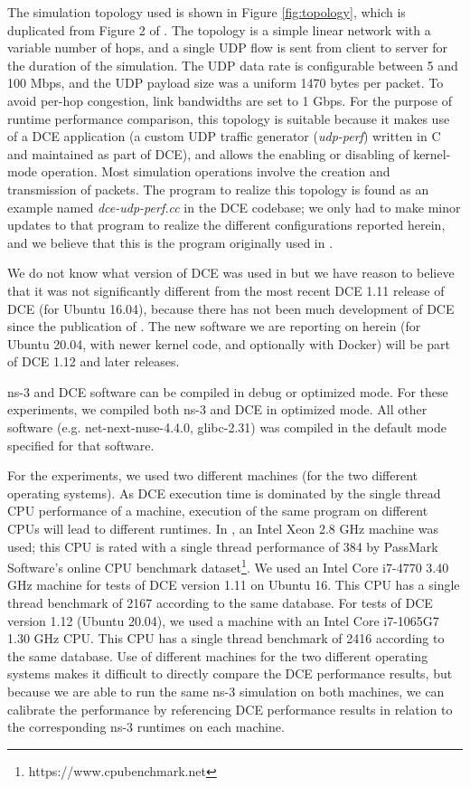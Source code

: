 \documentclass{sig-alternate}
\begin{document}
The simulation topology used is shown in Figure \ref{fig:topology}, which
is duplicated from Figure 2 of \cite{Tazaki13}.  The topology is a simple
linear network with a variable number of hops, and a single UDP flow
is sent from client to server for the duration of the simulation.
The UDP data rate is configurable between 5 and 100 Mbps, and the UDP
payload size was a uniform 1470 bytes per packet.
To avoid per-hop congestion, link bandwidths are set to 1 Gbps.
For the purpose of runtime performance comparison, this topology is
suitable because it makes use of a DCE application (a custom UDP traffic
generator (\emph{udp-perf}) written in C and maintained as part of DCE),
and allows the enabling or disabling of kernel-mode operation.  Most
simulation operations involve the creation and transmission of packets.
The program to realize this topology is found as an example named
\emph{dce-udp-perf.cc} in the DCE codebase; we only had to make minor
updates to that program to realize the different configurations reported
herein, and we believe that this is the program originally used
in \cite{Tazaki13}.

We do not know what version of DCE was used in \cite{Tazaki13} but we
have reason to believe that it was not significantly different from the
most recent DCE 1.11 release of DCE (for Ubuntu 16.04), because there
has not been much development of DCE since the publication of \cite{Tazaki13}.
The new software we are reporting on herein (for Ubuntu 20.04, with newer
kernel code, and optionally with Docker) will be part of DCE 1.12 and
later releases.

ns-3 and DCE software can be compiled in debug or optimized mode.  For
these experiments, we compiled both ns-3 and DCE in optimized mode.  All
other software (e.g. net-next-nuse-4.4.0, glibc-2.31) was compiled in
the default mode specified for that software.

For the experiments, we used two different machines (for the two different
operating systems).  As DCE execution time is dominated by the single thread
CPU performance of a machine, execution of the same program on different CPUs
will lead to
different runtimes.  In \cite{Tazaki13}, an Intel Xeon 2.8 GHz machine was
used; this CPU is rated with a single thread performance of 384 by PassMark
Software's online CPU benchmark dataset\footnote{https://www.cpubenchmark.net}.
We used an Intel Core i7-4770 3.40 GHz machine for tests of DCE version 1.11
on Ubuntu 16.  This CPU has a single thread benchmark of 2167 according
to the same database.  For tests of DCE version 1.12 (Ubuntu 20.04), we used
a machine with an Intel Core i7-1065G7 1.30 GHz CPU.  This CPU has a
single thread benchmark of 2416 according to the same database.  Use of
different machines for the two different operating systems makes it difficult
to directly compare the DCE performance results, but because we are able to
run the same ns-3 simulation on both machines, we can calibrate the
performance by referencing DCE performance results in relation to the
corresponding ns-3 runtimes on each machine.
\end{document}
